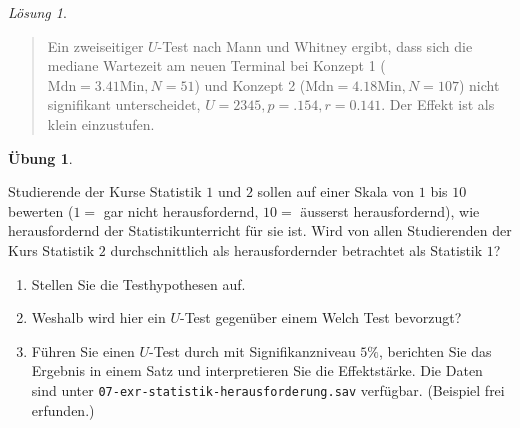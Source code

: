\documentclass[
]{book}
\providecommand{\tightlist}{%
  \setlength{\itemsep}{0pt}\setlength{\parskip}{0pt}}
\theoremstyle{definition}
\theoremstyle{definition}
\theoremstyle{definition}
\newtheorem{exercise}{Übung}[chapter]
\theoremstyle{definition}
\theoremstyle{remark}
\newtheorem*{solution}{Lösung}
\begin{document}
\begin{solution}
\begin{quote}
Ein zweiseitiger \(U\)-Test nach Mann und Whitney ergibt, dass sich die mediane Wartezeit am neuen Terminal bei Konzept 1 (\(\text{Mdn}= 3.41 \text{Min}, N =51\)) und Konzept 2 (\(\text{Mdn}=4.18 \text{Min}, N = 107\)) nicht signifikant unterscheidet, \(U = 2345, p = .154, r = 0.141\). Der Effekt ist als klein einzustufen.
\end{quote}

\end{solution}

\begin{exercise}
\protect\hypertarget{exr:statistik-herausforderung}{}\label{exr:statistik-herausforderung}\leavevmode

Studierende der Kurse Statistik \(1\) und \(2\) sollen auf einer Skala von \(1\) bis \(10\) bewerten (\(1=\) gar nicht herausfordernd, \(10 =\) äusserst herausfordernd), wie herausfordernd der Statistikunterricht für sie ist. Wird von allen Studierenden der Kurs Statistik \(2\) durchschnittlich als herausfordernder betrachtet als Statistik \(1\)?

\begin{enumerate}
\def\labelenumi{\alph{enumi})}
\tightlist
\item
  Stellen Sie die Testhypothesen auf.
\item
  Weshalb wird hier ein \(U\)-Test gegenüber einem Welch Test bevorzugt?
\item
  Führen Sie einen \(U\)-Test durch mit Signifikanzniveau \(5\%\), berichten Sie das Ergebnis in einem Satz und interpretieren Sie die Effektstärke. Die Daten sind unter \texttt{07-exr-statistik-herausforderung.sav} verfügbar. (Beispiel frei erfunden.)
\end{enumerate}

\end{exercise}
\end{document}
